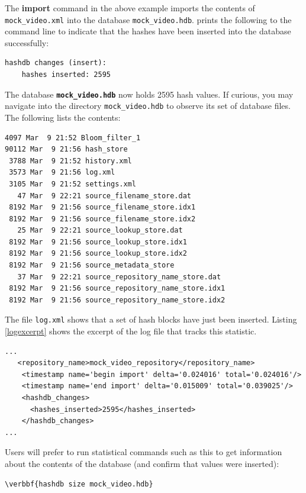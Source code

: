 \documentclass[11pt,fleqn]{article} %
\begin{document}
The \textbf{import} command in the above example imports the contents of \texttt{mock\_video.xml} into the database \texttt{mock\_video.hdb}. \hash prints the following to the command line to indicate that the hashes have been inserted into the database successfully: 

\begingroup
\footnotesize
\begin{Verbatim}[fontfamily=courier]
hashdb changes (insert):
    hashes inserted: 2595
\end{Verbatim}
\endgroup
The database \texttt{\textbf{mock\_video.hdb}} now holds 2595 hash values.
If curious, you may navigate into the directory \texttt{mock\_video.hdb} to observe its set of database files. The following lists the contents:
\begingroup
\footnotesize
\begin{Verbatim}[fontfamily=courier]
 4097 Mar  9 21:52 Bloom_filter_1
90112 Mar  9 21:56 hash_store
 3788 Mar  9 21:52 history.xml
 3573 Mar  9 21:56 log.xml
 3105 Mar  9 21:52 settings.xml
   47 Mar  9 22:21 source_filename_store.dat
 8192 Mar  9 21:56 source_filename_store.idx1
 8192 Mar  9 21:56 source_filename_store.idx2
   25 Mar  9 22:21 source_lookup_store.dat
 8192 Mar  9 21:56 source_lookup_store.idx1
 8192 Mar  9 21:56 source_lookup_store.idx2
 8192 Mar  9 21:56 source_metadata_store
   37 Mar  9 22:21 source_repository_name_store.dat
 8192 Mar  9 21:56 source_repository_name_store.idx1
 8192 Mar  9 21:56 source_repository_name_store.idx2
\end{Verbatim}
\endgroup

The file \texttt{log.xml} shows that a set of hash blocks have just been inserted. Listing \ref{logexcerpt} shows the excerpt of the log file that tracks this statistic.
\lstset{style=customfile}
\begin{lstlisting}[float, caption=Excerpt of the \texttt{log.xml} indicating hash blocks were inserted, label=logexcerpt]
...   
   <repository_name>mock_video_repository</repository_name>
    <timestamp name='begin import' delta='0.024016' total='0.024016'/>
    <timestamp name='end import' delta='0.015009' total='0.039025'/>
    <hashdb_changes>
      <hashes_inserted>2595</hashes_inserted>      
    </hashdb_changes>
...
\end{lstlisting}
Users will prefer to run statistical commands such as this to get information about the contents of the database (and confirm that values were inserted):
\begin{Verbatim}[commandchars=\\\{\}]
\verbbf{hashdb size mock_video.hdb}
\end{Verbatim}
\end{document}
